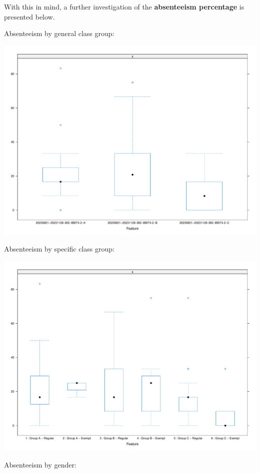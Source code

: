 \documentclass[
]{article}
\begin{document}
With this in mind, a further investigation of the \textbf{absenteeism
percentage} is presented below.

Absenteeism by general class group:

\includegraphics{AnalysisOfCourseEvaluation-Notebook_files/figure-latex/AbsenteeismBoxandWhiskerGroup-1.pdf}

\newpage

Absenteeism by specific class group:

\includegraphics{AnalysisOfCourseEvaluation-Notebook_files/figure-latex/AbsenteeismBoxandWhiskerSpecificGroup-1.pdf}

\newpage

Absenteeism by gender:
\end{document}
